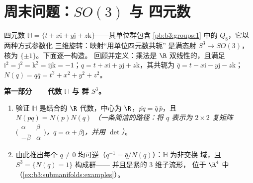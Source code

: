 \section{周末问题：\texorpdfstring{$SO(3)$}{SO(3)} 与
四元数}

\begin{problem}\label{pb:b3:submanifolds:1}
四元数 $\mathbb H = \{t + x\mathrm i + y\mathrm j +
z\mathrm k\}$——其单位群包含 \cref{pb:b3:groups:1} 中的
$Q_8$，它以两种方式参数化
三维旋转：映射“用单位四元数共轭”
是满态射 $S^3 \to
SO(3)$，核为 $\{\pm1\}$。下面逐一构造。
回顾并定义：乘法是 $\R$ 双线性的，且满足
$\mathrm i^2 = \mathrm j^2 = \mathrm k^2 =
\mathrm{ijk} = -1$；$q = t + x\mathrm i +
y\mathrm j + z\mathrm k$，其共轭为 $\bar q = t - x\mathrm i -
y\mathrm j - z\mathrm k$；$N(q) = q\bar q = t^2 + x^2 + y^2
+ z^2$。

\medskip
\noindent\textbf{第一部分——代数 $\mathbb H$ 与
群 $S^3$。}
\begin{enumerate}
  \item 验证 $\mathbb H$ 是结合的
        $\R$ 代数，中心为 $\R$，$\overline{pq} =
        \bar q\,\bar p$，且 $N(pq) = N(p)N(q)$
        \emph{（一条简洁的路径：将 $q$ 表示为
        $2\times2$ 复矩阵
        $\bigl(\begin{smallmatrix}\alpha & \beta\\
        -\bar\beta & \bar\alpha\end{smallmatrix}\bigr)$，$q =
        \alpha + \beta\mathrm j$，并用 $\det$）}。
  \item 由此推出每个 $q \neq 0$ 均可逆（$q^{-1} =
        \bar q/N(q)$）：$\mathbb H$ 为非交换
        域，且 $S^3 = \{N(q) = 1\}$ 构成群——
        并且是紧的 $3$ 维子流形，
        位于 $\R^4$ 中（\cref{ex:b3:submanifolds:examples}）。
\end{enumerate}


\end{problem}
